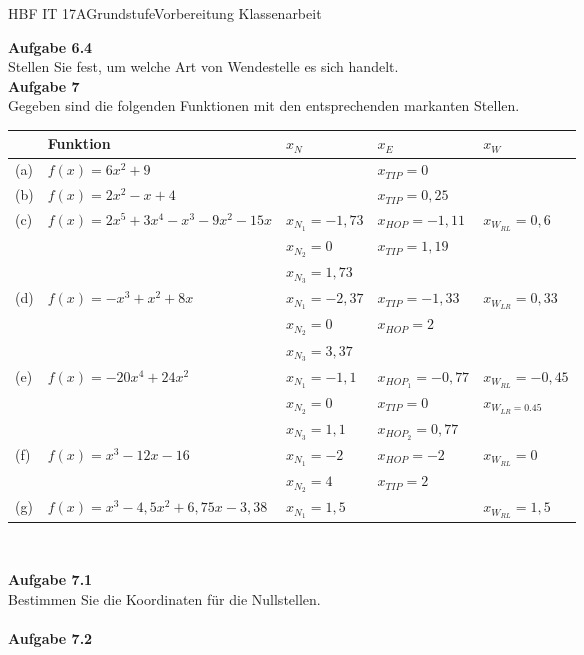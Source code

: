\documentclass[oneside,openany,headings=optiontotoc,11pt,numbers=noenddot]{scrreprt}
\begin{document}
\begin{worksheet}{HBF IT 17A}{Grundstufe}{Vorbereitung Klassenarbeit}
\begin{framed}
			\indent\textbf{Aufgabe 6.4}\\
			Stellen Sie fest, um welche Art von Wendestelle es sich handelt.\\
			\newpage
			\noindent
			\textbf{Aufgabe 7}\\
			Gegeben sind die folgenden Funktionen mit den entsprechenden markanten Stellen.\\
			\begin{tabularx}{\textwidth}{lXlll}
				& Funktion & \(x_N\) & \(x_E\) & \(x_W\)\\
				\hline
				(a) & \(f(x) =  6x^2 +9\) & & \(x_{TIP}= 0\) & \\
				\hline
				(b) & \(f(x) = 2x^2-x+4\) & & \(x_{TIP} = 0,25\) & \\
				\hline
				(c) & \(f(x) = 2x^5 +3x^4-x^3-9x^2-15x\) & \(x_{N_1}=-1,73\) & \(x_{HOP} = -1,11\) & \(x_{W_{RL}}=0,6\)\\
				& & \(x_{N_2}=0\) & \(x_{TIP}=1,19\) & \\
				& & \(x_{N_3}=1,73\)& & \\
				\hline
				(d) & \(f(x) = -x^3 +x^2+8x\) & \(x_{N_1}=-2,37\) & \(x_{TIP}=-1,33\) & \(x_{W_{LR}} = 0,33\)\\
				& & \(x_{N_2} = 0\) & \(x_{HOP}=2\) & \\
				& & \(x_{N_3} = 3,37\) & & \\
				\hline
				(e) & \(f(x) = -20x^4+24x^2\) & \(x_{N_1} = -1,1\) & \(x_{HOP_1} = -0,77\) & \(x_{W_{RL}} = -0,45\)\\
				& & \(x_{N_2} = 0\) & \(x_{TIP} = 0\) & \(x_{W_{LR}= 0.45}\)\\
				& & \(x_{N_3} = 1,1\) & \(x_{HOP_2} = 0,77\) & \\
				\hline
				(f) & \(f(x) = x^3-12x-16\) & \(x_{N_1}= -2\) & \(x_{HOP} = -2\) & \(x_{W_{RL}} = 0\)\\
				& & \(x_{N_2} = 4\) & \(x_{TIP} = 2\) & \\
				\hline
				(g) & \(f(x) = x^3-4,5x^2+6,75x-3,38\) & \(x_{N_1}= 1,5\) & & \(x_{W_{RL}} = 1,5\)\\
				\hline
			\end{tabularx}\\
			\par\bigskip
			\indent
			\textbf{Aufgabe 7.1}\\
			Bestimmen Sie die Koordinaten für die Nullstellen.\\
			\hdashrule[0.2ex][x]{\textwidth}{0.2mm}{1mm 3pt}\\
			\indent\textbf{Aufgabe 7.2}\\

\end{framed}
\end{worksheet}
\end{document}
